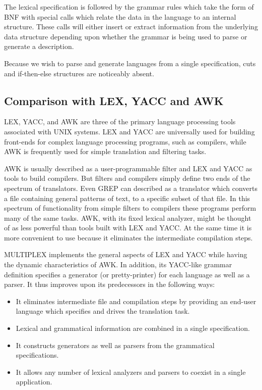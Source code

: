 The lexical specification is followed by the grammar
rules which take the form of BNF with special calls
which relate the data in the language to an internal structure.
These calls will either insert or
extract information from the underlying data structure
depending upon whether the grammar is being used to parse
or generate a description.

Because we wish to parse and generate languages from a single
specification, cuts and if-then-else structures are noticeably absent.

\subsection{Comparison with LEX, YACC and AWK}

LEX, YACC, and AWK are three of the primary language processing
tools associated with UNIX systems. LEX and YACC are universally
used for building front-ends for complex language processing
programs, such as compilers, while AWK is frequently
used for simple translation and filtering tasks.

AWK is usually described as a user-programmable filter and 
LEX and YACC as tools to build compilers. But filters and
compilers simply define two ends of the spectrum of translators.
Even GREP can described as a translator which converts a
file containing
general patterns of text, to a specific subset of that file.
In this spectrum of functionality from simple filters to
compilers these programs perform many of the same tasks.
AWK, with its fixed lexical analyzer, might 
be thought of as less powerful than tools
built with LEX and YACC.
At the same time it is more convenient to use because it
eliminates the intermediate compilation steps.

MULTIPLEX implements the general aspects of LEX and YACC
while having the dynamic characteristics of AWK.  In addition,
its YACC-like grammar definition specifies a generator (or 
pretty-printer) for each language as well as a parser.
It thus improves upon its predecessors in the following ways:

\begin{itemize}
\item{}
It eliminates intermediate file and compilation steps by
providing an end-user language which specifies
and drives the translation task.
\item{}
Lexical and grammatical information are combined
in a single specification.
\item{}
It constructs generators as well as parsers from
the grammatical specifications.
\item{}
It allows any number of lexical analyzers and parsers to
coexist in a single application.
\end{itemize}

